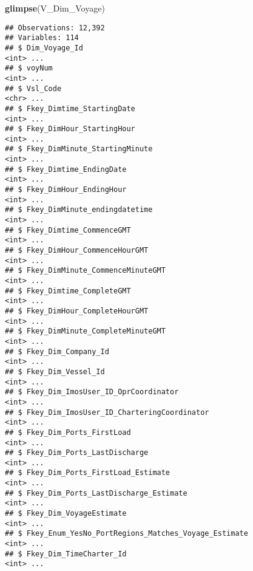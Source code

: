 \documentclass[]{article}
\newenvironment{Shaded}{\begin{snugshade}}{\end{snugshade}}
\newcommand{\KeywordTok}[1]{\textcolor[rgb]{0.13,0.29,0.53}{\textbf{#1}}}
\newcommand{\NormalTok}[1]{#1}
\begin{document}
\begin{Shaded}
\begin{Highlighting}[]
\KeywordTok{glimpse}\NormalTok{(V_Dim_Voyage)}
\end{Highlighting}
\end{Shaded}

\begin{verbatim}
## Observations: 12,392
## Variables: 114
## $ Dim_Voyage_Id                                                           <int> ...
## $ voyNum                                                                  <int> ...
## $ Vsl_Code                                                                <chr> ...
## $ Fkey_Dimtime_StartingDate                                               <int> ...
## $ Fkey_DimHour_StartingHour                                               <int> ...
## $ Fkey_DimMinute_StartingMinute                                           <int> ...
## $ Fkey_Dimtime_EndingDate                                                 <int> ...
## $ Fkey_DimHour_EndingHour                                                 <int> ...
## $ Fkey_DimMinute_endingdatetime                                           <int> ...
## $ Fkey_Dimtime_CommenceGMT                                                <int> ...
## $ Fkey_DimHour_CommenceHourGMT                                            <int> ...
## $ Fkey_DimMinute_CommenceMinuteGMT                                        <int> ...
## $ Fkey_Dimtime_CompleteGMT                                                <int> ...
## $ Fkey_DimHour_CompleteHourGMT                                            <int> ...
## $ Fkey_DimMinute_CompleteMinuteGMT                                        <int> ...
## $ Fkey_Dim_Company_Id                                                     <int> ...
## $ Fkey_Dim_Vessel_Id                                                      <int> ...
## $ Fkey_Dim_ImosUser_ID_OprCoordinator                                     <int> ...
## $ Fkey_Dim_ImosUser_ID_CharteringCoordinator                              <int> ...
## $ Fkey_Dim_Ports_FirstLoad                                                <int> ...
## $ Fkey_Dim_Ports_LastDischarge                                            <int> ...
## $ Fkey_Dim_Ports_FirstLoad_Estimate                                       <int> ...
## $ Fkey_Dim_Ports_LastDischarge_Estimate                                   <int> ...
## $ Fkey_Dim_VoyageEstimate                                                 <int> ...
## $ Fkey_Enum_YesNo_PortRegions_Matches_Voyage_Estimate                     <int> ...
## $ Fkey_Dim_TimeCharter_Id                                                 <int> ...

\end{verbatim}
\end{document}

